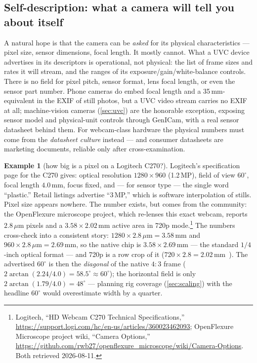 \documentclass[11pt]{article}
\theoremstyle{definition}
\newtheorem{example}{Example}
\begin{document}
\subsection{Self-description: what a camera will tell you about itself}
\label{sec:selfdesc}

A natural hope is that the camera can be \emph{asked} for its physical
characteristics --- pixel size, sensor dimensions, focal length. It
mostly cannot. What a UVC device advertises in its descriptors is
operational, not physical: the list of frame sizes and rates it will
stream, and the ranges of its exposure/gain/white-balance controls.
There is no field for pixel pitch, sensor format, lens focal length, or
even the sensor part number. Phone cameras do embed focal length and a
35\,mm-equivalent in the EXIF of still photos, but a UVC video stream
carries no EXIF at all; machine-vision cameras (\autoref{sec:uvc}) are
the honorable exception, exposing sensor model and physical-unit
controls through GenICam, with a real sensor datasheet behind them.
For webcam-class hardware the physical numbers must come from the
\emph{datasheet culture} instead --- and consumer datasheets are
marketing documents, reliable only after cross-examination.

\begin{example}[how big is a pixel on a Logitech C270?]
\label{ex:c270}
Logitech's specification page for the C270 gives: optical resolution
$1280\times960$ (1.2\,MP), field of view $60^\circ$, focal length
$4.0$\,mm, focus fixed, and --- for sensor type --- the single word
``plastic.'' Retail listings advertise ``3\,MP,'' which is software
interpolation of stills. Pixel size appears nowhere. The number
exists, but comes from the community: the OpenFlexure microscope
project, which re-lenses this exact webcam, reports $2.8\,\mu$m pixels
and a $3.58\times2.02$\,mm active area in 720p
mode.\footnote{Logitech, ``HD Webcam C270 Technical Specifications,''
\url{https://support.logi.com/hc/en-us/articles/360023462093}; OpenFlexure
Microscope project wiki, ``Camera Options,''
\url{https://github.com/rwb27/openflexure_microscope/wiki/Camera-Options}.
Both retrieved 2026-08-11.} The numbers cross-check into a consistent
story: $1280\times2.8\,\mu\text{m}=3.58$\,mm and
$960\times2.8\,\mu\text{m}=2.69$\,mm, so the native chip is
$3.58\times2.69$\,mm --- the standard $1/4$-inch optical format --- and
720p is a row crop of it ($720\times2.8=2.02$\,mm~\checkmark). The
advertised $60^\circ$ is then the \emph{diagonal} of the native $4{:}3$
frame ($2\arctan(2.24/4.0)=58.5^\circ\approx60^\circ$); the horizontal
field is only $2\arctan(1.79/4.0)=48^\circ$ --- planning rig coverage
(\autoref{sec:scaling}) with the headline $60^\circ$ would overestimate
width by a quarter.
\end{example}
\end{document}
